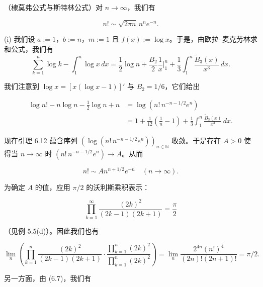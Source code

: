 \begin{example}

\begin{items}
\item

（棣莫弗公式与斯特林公式）对 $ n \to \infty $，我们有

\[
n! \sim \sqrt{2\pi n}\,n^n e^{-n} .
\]

\begin{subitems}
\item

\proofhead
(i) 我们设 $ a := 1 $，$ b := n $，$ m := 1 $ 且 $ f(x) := \log x $。于是，由欧拉–麦克劳林求和公式，我们有
\[
\sum_{k=1}^{n}\log k - \int_1^n \log x\,dx = \frac{1}{2}\log n + \frac{B_2}{2}\frac{1}{x}\Big|_1^n + \frac{1}{3}\int_1^n \frac{\widetilde{B}_3(x)}{x^3}\,dx .
\]

我们注意到 $ \log x = [x(\log x - 1)]' $ 与 $ B_2 = 1/6 $，它们给出

\begin{equation*}
\begin{aligned}
\log n! - n\log n - \frac{1}{2}\log n + n &= \log(n!\,n^{-n-1/2}e^n) \\ &= 1 + \frac{1}{12}\left( \frac{1}{n} - 1 \right) + \frac{1}{3}\int_1^n \frac{\widetilde{B}_3(x)}{x^3}\,dx .
\end{aligned}
\end{equation*}

现在引理 6.12 蕴含序列 $ (\log(n!\,n^{-n-1/2}e^n))_{n\in\mathbb{N}} $ 收敛。于是存在 $ A > 0 $ 使得当 $ n \to \infty $ 时 $ (n!\,n^{-n-1/2}e^n) \to A $。从而

\begin{equation}
n! \sim A n^{n+1/2}e^{-n} \quad (n \to \infty) .\tag{6.7}
\end{equation}
\item

为确定 $ A $ 的值，应用 $ \pi/2 $ 的沃利斯乘积表示：

\[
\prod_{k=1}^{\infty}\frac{(2k)^2}{(2k-1)(2k+1)} = \frac{\pi}{2}
\]

（见例 5.5(d)）。因此我们也有

\begin{equation}
\lim_{n}\left( \prod_{k=1}^{n}\frac{(2k)^2}{(2k-1)(2k+1)} \cdot \frac{\prod_{k=1}^{n}(2k)^2}{\prod_{k=1}^{n}(2k)^2} \right) = \lim_{n}\frac{2^{4n}(n!)^4}{(2n)!(2n+1)!} = \pi/2 .\tag{6.8}
\end{equation}

另一方面，由 (6.7)，我们有


\end{subitems}
\end{items}
\end{example}
